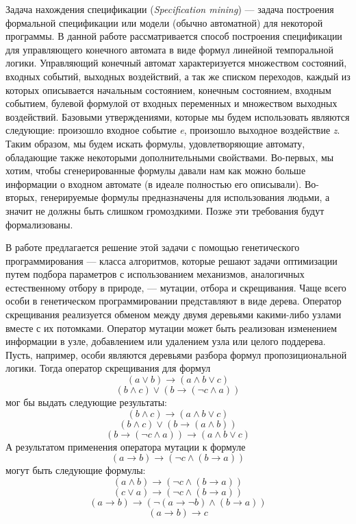 \documentclass[12pt,fleqn]{article}
\begin{document}
Задача нахождения спецификации (\emph{Specification mining}) --- задача построения формальной спецификации или модели
(обычно автоматной) для некоторой программы. В данной работе рассматривается способ построения спецификации
для управляющего конечного автомата в виде формул линейной темпоральной логики.
Управляющий конечный автомат характеризуется множеством состояний, входных событий, выходных воздействий,
а так же списком переходов, каждый из которых описывается начальным состоянием, конечным состоянием,
входным событием, булевой формулой от входных переменных и множеством выходных воздействий.
Базовыми утверждениями, которые мы будем использовать являются следующие: произошло входное событие
\emph{e}, произошло выходное воздействие \emph{z}. Таким образом, мы будем искать формулы, удовлетворяющие автомату,
обладающие также некоторыми дополнительными свойствами. Во-первых, мы хотим, чтобы сгенерированные
формулы давали нам как можно больше информации о входном автомате (в идеале полностью его описывали).
Во-вторых, генерируемые формулы предназначены для использования людьми, а значит не должны быть слишком громоздкими.
Позже эти требования будут формализованы.

В работе предлагается решение этой задачи с помощью генетического программирования --- класса алгоритмов,
которые решают задачи оптимизации путем подбора параметров с использованием механизмов, аналогичных естественному
отбору в природе, --- мутации, отбора и скрещивания. Чаще всего особи в генетическом программировании представляют
в виде дерева. Оператор скрещивания реализуется обменом между двумя деревьями какими-либо узлами вместе с их
потомками. Оператор мутации может быть реализован изменением информации в узле, добавлением или удалением узла
или целого поддерева. Пусть, например, особи являются деревьями разбора формул пропозициональной логики.
Тогда оператор скрещивания для формул
$$
(a \vee b) \rightarrow (a \wedge b \vee c)
$$
$$
(b \wedge c) \vee (b \rightarrow (\lnot c \wedge a))
$$
мог бы выдать следующие результаты:
$$
(b \wedge c) \rightarrow (a\wedge b \vee c)
$$
$$
(b \wedge c) \vee (b \rightarrow (a \wedge b))
$$
$$
(b \rightarrow (\lnot c \wedge a)) \rightarrow (a \wedge b \vee c)
$$
А результатом применения оператора мутации к формуле
$$
(a \rightarrow b) \rightarrow (\lnot c \wedge (b \rightarrow a))
$$
могут быть следующие формулы:
$$
(a \wedge b) \rightarrow (\lnot c \wedge (b \rightarrow a))
$$
$$
(c \vee a) \rightarrow (\lnot c \wedge (b \rightarrow a))
$$
$$
(a \rightarrow b) \rightarrow (\lnot (a \rightarrow \lnot b) \wedge (b \rightarrow a))
$$
$$
(a \rightarrow b) \rightarrow c
$$
\end{document}
